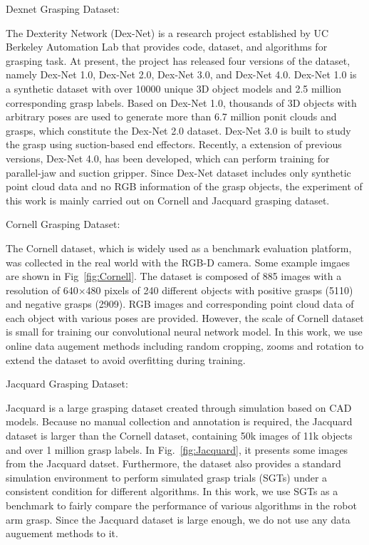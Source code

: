 \documentclass[journal]{IEEEtran}
\begin{document}
\begin{bfseries}
	Dexnet Grasping Dataset:
\end{bfseries} 
The Dexterity Network (Dex-Net) is a research project established by UC Berkeley Automation Lab that provides code, dataset, and algorithms for grasping task. At present, the project has released four versions of the dataset, namely Dex-Net 1.0, Dex-Net 2.0, Dex-Net 3.0, and Dex-Net 4.0. Dex-Net 1.0 is a synthetic dataset with over 10000 unique 3D object models and 2.5 million corresponding grasp labels. Based on Dex-Net 1.0, thousands of 3D objects with arbitrary poses are used to generate more than 6.7 million ponit clouds and grasps, which constitute the Dex-Net 2.0 dataset. Dex-Net 3.0 is built to study the grasp using suction-based end effectors. Recently, a extension of previous versions, Dex-Net 4.0, has been developed, which can perform training for parallel-jaw and suction gripper. Since Dex-Net dataset includes only synthetic point cloud data and no RGB information of the grasp objects, the experiment of this work is mainly carried out on Cornell and Jacquard grasping dataset.


\begin{bfseries}
	Cornell Grasping Dataset:
\end{bfseries} 
The Cornell dataset, which is widely used as a benchmark evaluation platform, was collected in the real world with the RGB-D camera. Some example imgaes are shown in Fig~\ref{fig:Cornell}. The dataset is composed of 885 images with a resolution of 640$\times$480 pixels of 240 different objects with positive grasps (5110) and negative grasps (2909). RGB images and corresponding point cloud data of each object with various poses are provided. However, the scale of Cornell dataset is small for training our convolutional neural network model. In this work, we use online data augement methods including random cropping, zooms and rotation to extend the dataset to avoid overfitting during training.




\begin{bfseries}
	Jacquard Grasping Dataset: 
\end{bfseries}
Jacquard is a large grasping dataset created through simulation based on CAD models. Because no manual collection and annotation is required, the Jacquard dataset is larger than the Cornell dataset, containing 50k images of 11k objects and over 1 million grasp labels. In Fig.~\ref{fig:Jacquard}, it presents some images from the Jacquard datset. Furthermore, the dataset also provides a standard simulation environment to perform simulated grasp trials (SGTs) under a consistent condition for different algorithms. In this work, we use SGTs as a benchmark to fairly compare the performance of various algorithms in the robot arm grasp. Since the Jacquard dataset is large enough, we do not use any data auguement methods to it.
\end{document}
